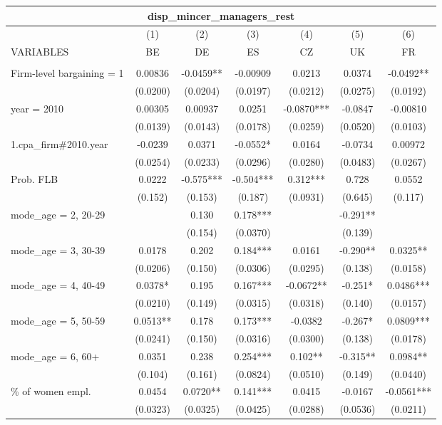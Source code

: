 \documentclass[]{article}
\begin{document}
\begin{tabular}{lcccccc}
\multicolumn{7}{c}{disp\_mincer\_managers\_rest} \\ \hline
 & (1) & (2) & (3) & (4) & (5) & (6) \\
VARIABLES & BE & DE & ES & CZ & UK & FR \\ \hline
 &  &  &  &  &  &  \\
Firm-level bargaining = 1 & 0.00836 & -0.0459** & -0.00909 & 0.0213 & 0.0374 & -0.0492** \\
 & (0.0200) & (0.0204) & (0.0197) & (0.0212) & (0.0275) & (0.0192) \\
year = 2010 & 0.00305 & 0.00937 & 0.0251 & -0.0870*** & -0.0847 & -0.00810 \\
 & (0.0139) & (0.0143) & (0.0178) & (0.0259) & (0.0520) & (0.0103) \\
1.cpa\_firm\#2010.year & -0.0239 & 0.0371 & -0.0552* & 0.0164 & -0.0734 & 0.00972 \\
 & (0.0254) & (0.0233) & (0.0296) & (0.0280) & (0.0483) & (0.0267) \\
Prob. FLB & 0.0222 & -0.575*** & -0.504*** & 0.312*** & 0.728 & 0.0552 \\
 & (0.152) & (0.153) & (0.187) & (0.0931) & (0.645) & (0.117) \\
mode\_age = 2, 20-29 &  & 0.130 & 0.178*** &  & -0.291** &  \\
 &  & (0.154) & (0.0370) &  & (0.139) &  \\
mode\_age = 3, 30-39 & 0.0178 & 0.202 & 0.184*** & 0.0161 & -0.290** & 0.0325** \\
 & (0.0206) & (0.150) & (0.0306) & (0.0295) & (0.138) & (0.0158) \\
mode\_age = 4, 40-49 & 0.0378* & 0.195 & 0.167*** & -0.0672** & -0.251* & 0.0486*** \\
 & (0.0210) & (0.149) & (0.0315) & (0.0318) & (0.140) & (0.0157) \\
mode\_age = 5, 50-59 & 0.0513** & 0.178 & 0.173*** & -0.0382 & -0.267* & 0.0809*** \\
 & (0.0241) & (0.150) & (0.0316) & (0.0300) & (0.138) & (0.0178) \\
mode\_age = 6, 60+ & 0.0351 & 0.238 & 0.254*** & 0.102** & -0.315** & 0.0984** \\
 & (0.104) & (0.161) & (0.0824) & (0.0510) & (0.149) & (0.0440) \\
\% of women empl. & 0.0454 & 0.0720** & 0.141*** & 0.0415 & -0.0167 & -0.0561*** \\
 & (0.0323) & (0.0325) & (0.0425) & (0.0288) & (0.0536) & (0.0211) \\

\end{tabular}
\end{document}
